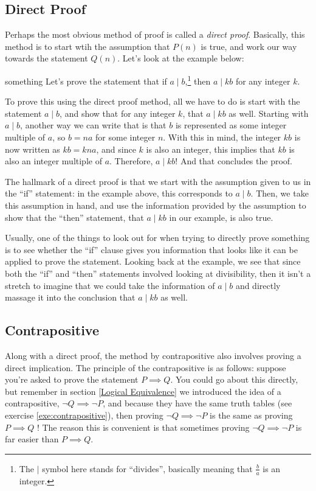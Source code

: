 \subsection{Direct Proof}
Perhaps the most obvious method of proof is called a \textit{direct proof}. Basically, this method is to start 
wtih the assumption that \( P(n) \) is true, and work our way towards the statement \( Q(n) \). Let's look at the 
example below:
\begin{example}{}{something}
	Let's prove the statement that if \( a \mid b \),\footnote{The $\mid$ symbol here stands for ``divides'', basically 
	meaning that \( \frac{b}{a} \) is an integer.} then \( a \mid kb \) for any integer \( k \). 

	To prove this using the direct proof method, all we have to do is start with the statement \( a \mid b \), and show 
	that for any integer \( k \), that \( a \mid kb \) as well. Starting with \( a \mid b \), another way we can 
	write that is that \( b \) is represented as some integer multiple of \( a \), so \( b = na \) for some 
	integer \( n \). With this in mind, the integer \( kb \) is now written as \( kb = kna \), and since \( k \) is
	also an integer, this implies that \( kb \) is also an integer multiple of \( a \). Therefore, 
	\( a \mid kb \)! And that concludes the proof. 
\end{example}

The hallmark of a direct proof is that we start with the assumption given to us in the ``if'' statement: in the 
example above, this corresponds to \( a \mid b \). Then, we take this assumption in hand, and use the information 
provided by the assumption to show that the ``then'' statement, that \( a \mid kb \) in our example, is also true.  

Usually, one of the things to look out for when trying to directly prove something is to see whether the ``if'' 
clause gives you information that looks like it can be applied to prove the statement. Looking back at the example, 
we see that since both the ``if'' and ``then'' statements involved looking at divisibility, then it isn't a stretch 
to imagine that we could take the information of \( a \mid b \) and directly massage it into the conclusion that 
\( a \mid kb \) as well. 

 
\subsection{Contrapositive}
Along with a direct proof, the method by contrapositive also involves proving a direct implication. The principle 
of the contrapositive is as follows: suppose you're asked to prove the statement \( P \implies Q \). You could go 
about this directly, but remember in section \ref{Logical Equivalence} we introduced the idea of a contrapositive, 
\( \neg Q \implies \neg P \), and because they have the same truth tables (see exercise \ref{exe:contrapositive}), 
then proving \( \neg Q \implies \neg P \) is the same as proving \( P \implies Q \) ! The reason this is 
convenient is that sometimes proving \( \neg Q \implies \neg P \) is far easier than \( P \implies Q \). 

